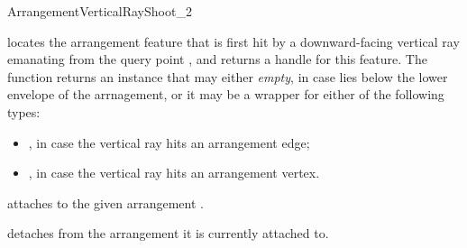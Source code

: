\begin{ccRefConcept}{ArrangementVerticalRayShoot_2}
  {locates the arrangement feature that is first hit by a downward-facing
   vertical ray emanating from the query point ,
   and returns a handle for this feature.
   The function returns an  instance that may either {\sl empty},
   in case  lies below the lower envelope of the arrnagement, or it
   may be a wrapper for either of the following types:
   \begin{itemize}
   \item {}, in case the vertical
         ray hits an arrangement edge;
   \item {}, in case the vertical
         ray hits an arrangement vertex.
   \end{itemize}
   }

\ccOperations

  {attaches \ccVar{} to the given arrangement .}

  {detaches \ccVar{} from the arrangement it is currently attached to.}

\ccHasModels

\\
 \\
\\
\\

\end{ccRefConcept}

\ccRefPageEnd

